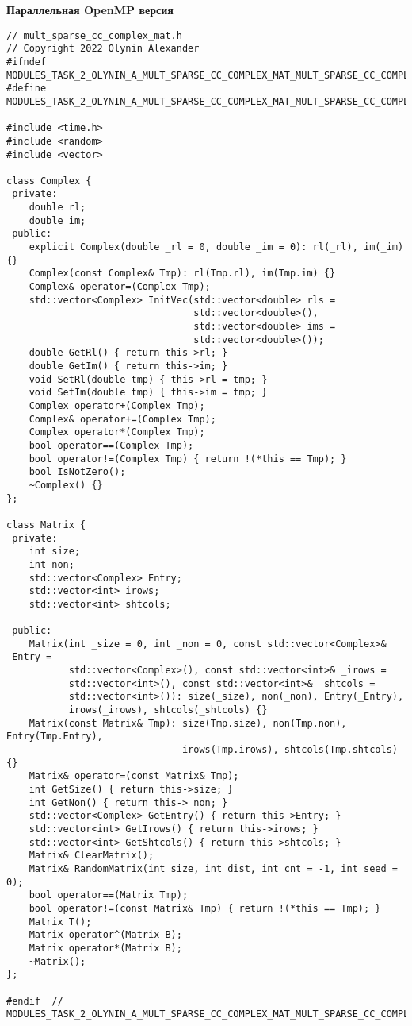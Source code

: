 \documentclass[12pt]{report}
\begin{document}
\textbf{Параллельная OpenMP версия}
\begin{lstlisting}
// mult_sparse_cc_complex_mat.h
// Copyright 2022 Olynin Alexander
#ifndef MODULES_TASK_2_OLYNIN_A_MULT_SPARSE_CC_COMPLEX_MAT_MULT_SPARSE_CC_COMPLEX_MAT_H_
#define MODULES_TASK_2_OLYNIN_A_MULT_SPARSE_CC_COMPLEX_MAT_MULT_SPARSE_CC_COMPLEX_MAT_H_

#include <time.h>
#include <random>
#include <vector>

class Complex {
 private:
    double rl;
    double im;
 public:
    explicit Complex(double _rl = 0, double _im = 0): rl(_rl), im(_im) {}
    Complex(const Complex& Tmp): rl(Tmp.rl), im(Tmp.im) {}
    Complex& operator=(Complex Tmp);
    std::vector<Complex> InitVec(std::vector<double> rls =
                                 std::vector<double>(),
                                 std::vector<double> ims =
                                 std::vector<double>());
    double GetRl() { return this->rl; }
    double GetIm() { return this->im; }
    void SetRl(double tmp) { this->rl = tmp; }
    void SetIm(double tmp) { this->im = tmp; }
    Complex operator+(Complex Tmp);
    Complex& operator+=(Complex Tmp);
    Complex operator*(Complex Tmp);
    bool operator==(Complex Tmp);
    bool operator!=(Complex Tmp) { return !(*this == Tmp); }
    bool IsNotZero();
    ~Complex() {}
};

class Matrix {
 private:
    int size;
    int non;
    std::vector<Complex> Entry;
    std::vector<int> irows;
    std::vector<int> shtcols;

 public:
    Matrix(int _size = 0, int _non = 0, const std::vector<Complex>& _Entry =
           std::vector<Complex>(), const std::vector<int>& _irows =
           std::vector<int>(), const std::vector<int>& _shtcols =
           std::vector<int>()): size(_size), non(_non), Entry(_Entry),
           irows(_irows), shtcols(_shtcols) {}
    Matrix(const Matrix& Tmp): size(Tmp.size), non(Tmp.non), Entry(Tmp.Entry),
                               irows(Tmp.irows), shtcols(Tmp.shtcols) {}
    Matrix& operator=(const Matrix& Tmp);
    int GetSize() { return this->size; }
    int GetNon() { return this-> non; }
    std::vector<Complex> GetEntry() { return this->Entry; }
    std::vector<int> GetIrows() { return this->irows; }
    std::vector<int> GetShtcols() { return this->shtcols; }
    Matrix& ClearMatrix();
    Matrix& RandomMatrix(int size, int dist, int cnt = -1, int seed = 0);
    bool operator==(Matrix Tmp);
    bool operator!=(const Matrix& Tmp) { return !(*this == Tmp); }
    Matrix T();
    Matrix operator^(Matrix B);
    Matrix operator*(Matrix B);
    ~Matrix();
};

#endif  // MODULES_TASK_2_OLYNIN_A_MULT_SPARSE_CC_COMPLEX_MAT_MULT_SPARSE_CC_COMPLEX_MAT_H_

\end{lstlisting}
\end{document}
